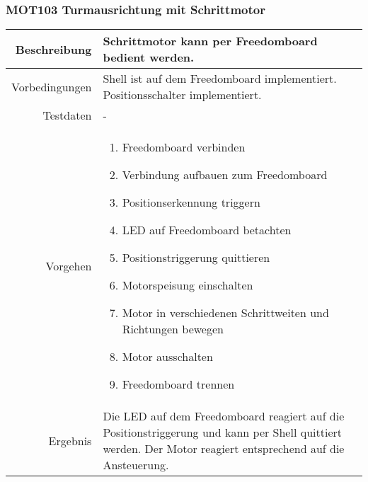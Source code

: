 \newpage
\subsubsection{MOT103 Turmausrichtung mit Schrittmotor}
\begin{table}[h!]
	\renewcommand{\arraystretch}{1.5}
	\begin{tabular}{|r|p{14cm}|}
		\hline Beschreibung	&
			Schrittmotor kann per Freedomboard bedient werden. \\ 
		\hline Vorbedingungen	&
			Shell ist auf dem Freedomboard implementiert.
			Positionsschalter implementiert. \\ 
		\hline Testdaten	& - \\ 
		\hline Vorgehen		& 
		\begin{enumerate}
			\item Freedomboard verbinden
			\item Verbindung aufbauen zum Freedomboard
			\item Positionserkennung triggern
			\item LED auf Freedomboard betachten
			\item Positionstriggerung quittieren
			\item Motorspeisung einschalten
			\item Motor in verschiedenen Schrittweiten und Richtungen bewegen
			\item Motor ausschalten
			\item Freedomboard trennen
		\end{enumerate} \\ 
		\hline Ergebnis 	&
			Die LED auf dem Freedomboard reagiert auf die
			Positionstriggerung und kann per Shell quittiert werden.
			Der Motor reagiert entsprechend auf die Ansteuerung. \\ 
		\hline 
	\end{tabular}
\end{table}

\newpage
